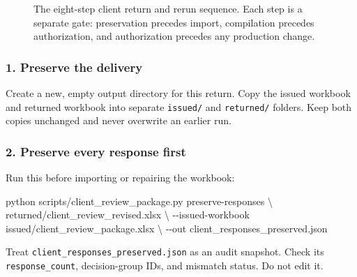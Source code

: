 \documentclass[
]{article}
\newenvironment{Shaded}{}{}
\newcommand{\AttributeTok}[1]{\textcolor[rgb]{0.49,0.56,0.16}{#1}}
\newcommand{\DataTypeTok}[1]{\textcolor[rgb]{0.56,0.13,0.00}{#1}}
\newcommand{\ExtensionTok}[1]{#1}
\newcommand{\NormalTok}[1]{#1}
\begin{document}
\begin{figure}[htbp]
{
}
\caption{The eight-step client return and rerun sequence. Each step is a separate gate: preservation precedes import, compilation precedes authorization, and authorization precedes any production change.}
\end{figure}

\subsubsection{1. Preserve the delivery}\label{preserve-the-delivery}

Create a new, empty output directory for this return. Copy the issued
workbook and returned workbook into separate
\texttt{issued/\allowbreak{}} and \texttt{returned/\allowbreak{}}
folders. Keep both copies unchanged and never overwrite an earlier run.

\subsubsection{2. Preserve every response
first}\label{preserve-every-response-first}

Run this before importing or repairing the workbook:

\begin{Shaded}
\begin{Highlighting}[]
\ExtensionTok{python}\NormalTok{ scripts/client\_review\_package.py preserve{-}responses }\DataTypeTok{\textbackslash{}}
\NormalTok{  returned/client\_review\_revised.xlsx }\DataTypeTok{\textbackslash{}}
  \AttributeTok{{-}{-}issued{-}workbook}\NormalTok{ issued/client\_review\_package.xlsx }\DataTypeTok{\textbackslash{}}
  \AttributeTok{{-}{-}out}\NormalTok{ client\_responses\_preserved.json}
\end{Highlighting}
\end{Shaded}

Treat
\texttt{client\_\allowbreak{}responses\_\allowbreak{}preserved.json} as
an audit snapshot. Check its \texttt{response\_\allowbreak{}count},
decision-group IDs, and mismatch status. Do not edit it.
\end{document}
